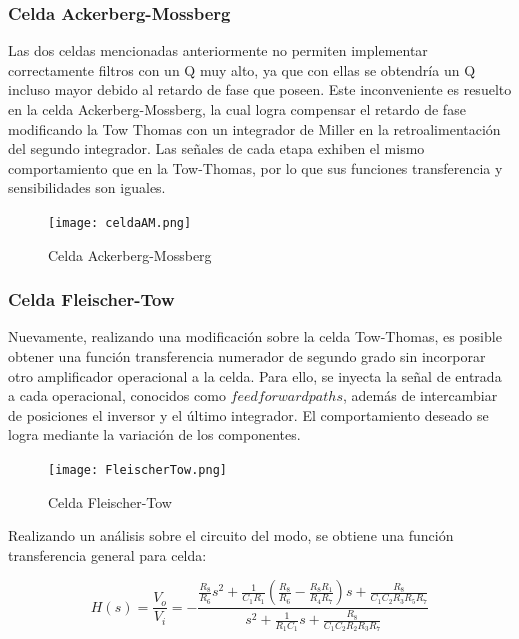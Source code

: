 \subsubsection{Celda Ackerberg-Mossberg}

Las dos celdas mencionadas anteriormente no permiten implementar correctamente filtros con un Q muy alto, ya que con ellas se obtendría un Q incluso mayor debido al retardo de fase que poseen. Este inconveniente es resuelto en la celda Ackerberg-Mossberg, la cual logra compensar el retardo de fase modificando la Tow Thomas con un integrador de Miller en la retroalimentación del segundo integrador. Las señales de cada etapa exhiben el mismo comportamiento que en la Tow-Thomas, por lo que sus funciones transferencia y sensibilidades son iguales. 

\begin{figure}[H]
    \centering
    \texttt{[image: celdaAM.png]}
    \caption{Celda Ackerberg-Mossberg}
    \label{fig:celdaAM}
\end{figure}


\subsubsection{Celda Fleischer-Tow}


Nuevamente, realizando una modificación sobre la celda Tow-Thomas, es posible obtener una función transferencia numerador de segundo grado sin incorporar otro amplificador operacional a la celda. Para ello, se inyecta la señal de entrada a cada operacional, conocidos como $feedforward paths$, además de intercambiar de posiciones el inversor y el último integrador. El comportamiento deseado se logra mediante la variación de los componentes.  

\begin{figure}[H]
    \centering
    \texttt{[image: FleischerTow.png]}
    \caption{Celda Fleischer-Tow}
    \label{fig:FleischerTow}
\end{figure}

Realizando un análisis sobre el circuito del modo, se obtiene una función transferencia general para celda:


\begin{equation}
        H(s) = \frac{V_{o}}{V_{i}} = -\frac{\frac{R_{8}}{R_{6}}s^{2}+\frac{1}{C_{1}R_{1}}(\frac{R_{8}}{R_{6}}-\frac{R_{8}R_{1}}{R_{4}R_{7}})s + \frac{R_{8}}{C_{1}C_{2}R_{3}R_{5}R_{7}}}{s^{2} + \frac{1}{R_{1}C_{1}} s + \frac{R_{8}}{C_{1}C_{2}R_{2}R_{3}R_{7}}}
    \label{eq:FT1}
\end{equation}

